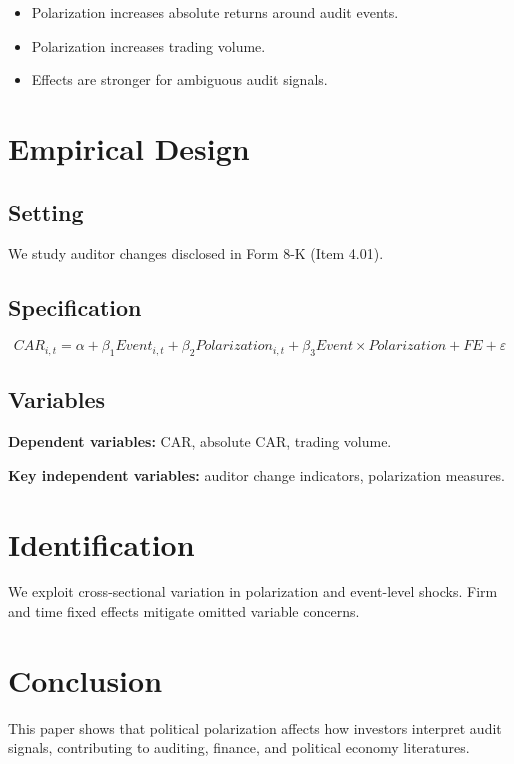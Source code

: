\documentclass[12pt]{article}
\begin{document}
\begin{itemize}
\item Polarization increases absolute returns around audit events.
\item Polarization increases trading volume.
\item Effects are stronger for ambiguous audit signals.
\end{itemize}

\section{Empirical Design}

\subsection{Setting}

We study auditor changes disclosed in Form 8-K (Item 4.01).

\subsection{Specification}

\begin{equation}
CAR_{i,t} = \alpha + \beta_1 Event_{i,t} + \beta_2 Polarization_{i,t} + \beta_3 Event \times Polarization + FE + \varepsilon
\end{equation}

\subsection{Variables}

\textbf{Dependent variables:} CAR, absolute CAR, trading volume.

\textbf{Key independent variables:} auditor change indicators, polarization measures.

\section{Identification}

We exploit cross-sectional variation in polarization and event-level shocks. Firm and time fixed effects mitigate omitted variable concerns.

\section{Conclusion}

This paper shows that political polarization affects how investors interpret audit signals, contributing to auditing, finance, and political economy literatures.



\end{document}
